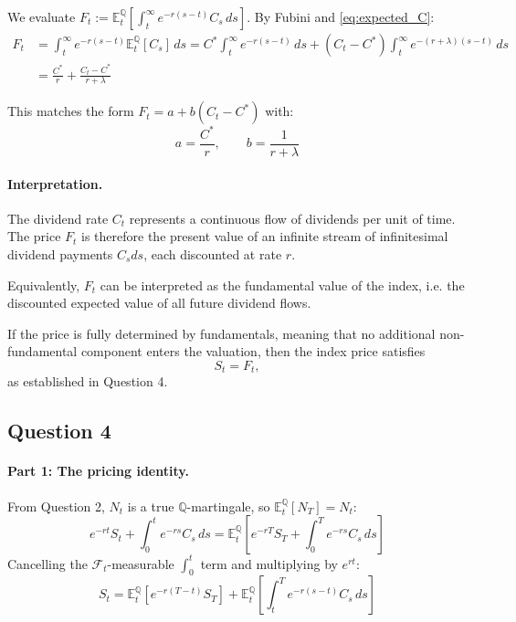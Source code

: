 \documentclass[12pt,a4paper]{article}
\begin{document}
We evaluate $F_t := \mathbb{E}^{\mathbb{Q}}_t \left[ \int_t^\infty e^{-r(s-t)} C_s \,ds \right]$. By Fubini and \eqref{eq:expected_C}:
\begin{align*}
    F_t &= \int_t^\infty e^{-r(s-t)} \mathbb{E}^{\mathbb{Q}}_t[C_s] \,ds = C^* \int_t^\infty e^{-r(s-t)}\,ds + (C_t - C^*) \int_t^\infty e^{-(r+\lambda)(s-t)}\,ds \\
    &= \frac{C^*}{r} + \frac{C_t - C^*}{r+\lambda}
\end{align*}

This matches the form $F_t = a + b(C_t - C^*)$ with:
\begin{equation*}
    \boxed{\,a = \frac{C^*}{r}, \qquad b = \frac{1}{r+\lambda}\,}
\end{equation*}

\paragraph{Interpretation.} The dividend rate $C_t$ represents a continuous flow of dividends per unit of time. The price $F_t$ is therefore the present value of an infinite stream of infinitesimal dividend payments $C_s ds$, each discounted at rate $r$.

Equivalently, $F_t$ can be interpreted as the fundamental value of the index, i.e. the discounted expected value of all future dividend flows.

If the price is fully determined by fundamentals, meaning that no additional non-fundamental component enters the valuation, then the index price satisfies
\[
S_t = F_t,
\]
as established in Question 4.

\subsection*{Question 4}

\paragraph{Part 1: The pricing identity.}
From Question 2, $N_t$ is a true $\mathbb{Q}$-martingale, so $\mathbb{E}^{\mathbb{Q}}_t[N_T] = N_t$:
\begin{equation*}
    e^{-rt}S_t + \int_0^t e^{-rs}C_s\,ds = \mathbb{E}^{\mathbb{Q}}_t\left[e^{-rT}S_T + \int_0^T e^{-rs}C_s\,ds\right]
\end{equation*}
Cancelling the $\mathcal{F}_t$-measurable $\int_0^t$ term and multiplying by $e^{rt}$:
\begin{equation}
    \boxed{\,S_t = \mathbb{E}^{\mathbb{Q}}_t\!\left[ e^{-r(T-t)} S_T \right] + \mathbb{E}^{\mathbb{Q}}_t\!\left[ \int_t^T e^{-r(s-t)} C_s \,ds \right]\,} \label{eq:Q4-spot}
\end{equation}
\end{document}
